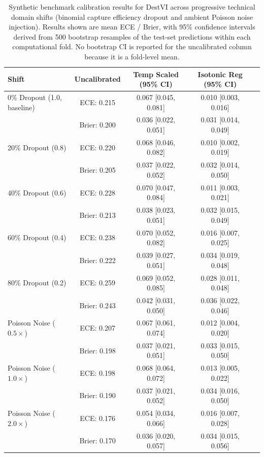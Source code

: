 \documentclass{jmlr} %
\begin{document}
\begin{table}[t!]
\centering
\footnotesize
\caption{Synthetic benchmark calibration results for DestVI across progressive technical domain shifts (binomial capture efficiency dropout and ambient Poisson noise injection). Results shown are mean ECE / Brier, with 95\% confidence intervals derived from 500 bootstrap resamples of the test-set predictions within each computational fold. No bootstrap CI is reported for the uncalibrated column because it is a fold-level mean.}
\label{tab:results}
\begin{tabular}{l c c c c}
\toprule
Shift & Uncalibrated & Temp Scaled (95\% CI) & Isotonic Reg (95\% CI) \\
\midrule
0\% Dropout (1.0, baseline) & ECE: 0.215 & 0.067 [0.045, 0.081] & 0.010 [0.003, 0.016] \\
                            & Brier: 0.200 & 0.036 [0.022, 0.051] & 0.031 [0.014, 0.049] & \\
20\% Dropout (0.8) & ECE: 0.220 & 0.068 [0.046, 0.082] & 0.010 [0.002, 0.019] \\
                   & Brier: 0.205 & 0.037 [0.022, 0.052] & 0.032 [0.014, 0.050] & \\
40\% Dropout (0.6) & ECE: 0.228 & 0.070 [0.047, 0.084] & 0.011 [0.003, 0.021] \\
                   & Brier: 0.213 & 0.038 [0.023, 0.051] & 0.032 [0.015, 0.049] & \\
60\% Dropout (0.4) & ECE: 0.238 & 0.070 [0.052, 0.082] & 0.016 [0.007, 0.025] \\
                   & Brier: 0.222 & 0.039 [0.027, 0.051] & 0.034 [0.019, 0.048] & \\
80\% Dropout (0.2) & ECE: 0.259 & 0.069 [0.052, 0.085] & 0.028 [0.011, 0.048] \\
                   & Brier: 0.243 & 0.042 [0.031, 0.050] & 0.036 [0.022, 0.046] & \\
\midrule
Poisson Noise ($0.5\times$) & ECE: 0.207 & 0.067 [0.061, 0.074] & 0.012 [0.004, 0.020] \\
                            & Brier: 0.198 & 0.037 [0.021, 0.051] & 0.033 [0.015, 0.050] & \\
Poisson Noise ($1.0\times$) & ECE: 0.198 & 0.068 [0.064, 0.072] & 0.013 [0.005, 0.022] \\
                            & Brier: 0.190 & 0.037 [0.021, 0.052] & 0.034 [0.016, 0.050] & \\
Poisson Noise ($2.0\times$) & ECE: 0.176 & 0.054 [0.034, 0.066] & 0.016 [0.007, 0.028] \\
                            & Brier: 0.170 & 0.036 [0.020, 0.057] & 0.034 [0.015, 0.056] & \\
\bottomrule
\end{tabular}
\end{table}
\end{document}
